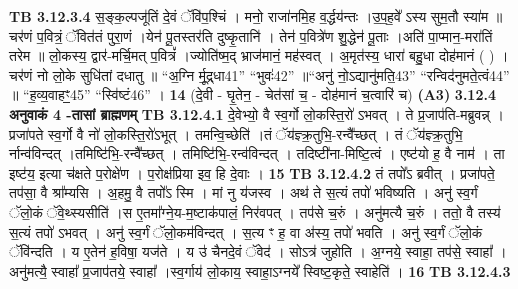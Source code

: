 \documentclass[17pt]{extarticle}
\begin{document}
{{{{{{{{{{{{{{{{{{{{{{{                  \newline
                                \textbf{ TB 3.12.3.4} \newline
                  स॒ङ्क॒ल्पजू॑तिं दे॒वं ॅवि॑प॒श्चिं । मनो॒ राजा॑नमि॒ह व॒र्द्धय॑न्तः ।उ॒प॒ह॒वे᳚ ऽस्य सुम॒तौ स्या॑म ॥ चर॑णं प॒वित्रं॒ ॅवित॑तं पुरा॒णं ।येन॑ पू॒तस्तर॑ति दुष्कृ॒तानि॑ । तेन॑ प॒वित्रे॑ण शु॒द्धेन॑ पू॒ताः ।अति॑ पा॒प्मान॒-मरा॑तिं तरेम ॥ लो॒कस्य॒ द्वार॑-मर्चि॒मत् प॒वित्रं᳚ ।ज्योति॑ष्म॒द् भ्राज॑मानं॒ मह॑स्वत् । अ॒मृत॑स्य॒ धारा॑ बहु॒धा दोह॑मानं ( ) । चर॑णं नो लो॒के सुधि॑तां दधातु ॥ “अ॒ग्नि र्मू॒द्र्धा{41}” “भुवः॑{42}” ॥“अनु॑ नो॒ऽद्यानु॑मति॒{43}” “रन्विद॑नुमते॒त्वं{44}” ॥ “ह॒व्य॒वाहꣳ॒॒{45}” “स्वि॑ष्टं{46}” । \textbf{ 14} \newline
                  \newline
                                    (दे॒वी - घृ॒तेन॒ - चेत॑सां च॒ - दोह॑मानं च॒त्वारि॑ च) \textbf{(A3)} \newline \newline
                \textbf{ 3.12.4    अनुवाकं   4 -तासां ब्राह्मणम्} \newline
                                \textbf{ TB 3.12.4.1} \newline
                  दे॒वेभ्यो॒ वै स्व॒र्गो लो॒कस्ति॒रो॑ ऽभवत् । ते प्र॒जाप॑ति-मब्रुवन्न् । प्रजा॑पते स्व॒र्गो वै नो॑ लो॒कस्ति॒रो॑ऽभूत् । तमन्वि॒च्छेति॑ ।तं ॅय॑ज्ञ्क्र॒तुभि॒-रन्वै᳚च्छत् । तं ॅय॑ज्ञ्क्र॒तुभि॒ र्नान्व॑विन्दत् ।तमिष्टि॑भि॒-रन्वै᳚च्छत् । तमिष्टि॑भि॒-रन्व॑विन्दत् । तदिष्टी॑ना-मिष्टि॒त्वं । एष्ट॑यो ह॒ वै नाम॑ । ता इष्ट॑य॒ इत्या च॑क्षते प॒रोक्षे॑ण । प॒रोक्ष॑प्रिया इव॒ हि दे॒वाः । \textbf{ 15} \newline
                  \newline
                                \textbf{ TB 3.12.4.2} \newline
                  तं तपो᳚ऽ ब्रवीत् । प्रजा॑पते॒ तप॑सा॒ वै श्रा᳚म्यसि । अ॒हमु॒ वै तपो᳚ऽ स्मि । मां नु य॑जस्व । अथ॑ ते स॒त्यं तपो॑ भविष्यति । अनु॑ स्व॒र्गं ॅलो॒कं ॅवे॒थ्स्यसीति॑ ।स ए॒तमा᳚ग्ने॒य-म॒ष्टाक॑पालं॒ निर॑वपत् । तप॑से च॒रुं । अनु॑मत्यै च॒रुं । ततो॒ वै तस्य॑ स॒त्यं तपो॑ ऽभवत् । अनु॑ स्व॒र्गं ॅलो॒कम॑विन्दत् । स॒त्य ꣳ ह॒ वा अ॑स्य॒ तपो॑ भवति । अनु॑ स्व॒र्गं ॅलो॒कं ॅवि॑न्दति । य ए॒तेन॑ ह॒विषा॒ यज॑ते । य उ॑ चैनदे॒वं ॅवेद॑ । सोऽत्र॑ जुहोति । अ॒ग्नये॒ स्वाहा॒ तप॑से॒ स्वाहा᳚ । अनु॑मत्यै॒ स्वाहा᳚ प्र॒जाप॑तये॒ स्वाहा᳚ ।स्व॒र्गाय॑ लो॒काय॒ स्वाहा॒ऽग्नये᳚ स्विष्ट॒कृते॒ स्वाहेति॑ । \textbf{ 16} \newline
                  \newline
                                \textbf{ TB 3.12.4.3} \newline
}}}}}}}}}}}}}}}}}}}}}}}
\end{document}
